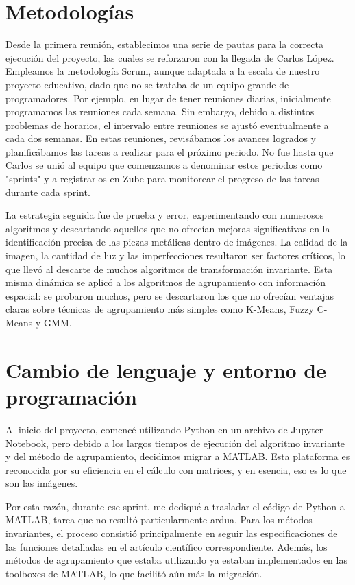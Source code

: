 \section{Metodologías}\label{Metodologías}

Desde la primera reunión, establecimos una serie de pautas para la correcta ejecución del proyecto, las cuales se reforzaron con la llegada de Carlos López. Empleamos la metodología Scrum, aunque adaptada a la escala de nuestro proyecto educativo, dado que no se trataba de un equipo grande de programadores. Por ejemplo, en lugar de tener reuniones diarias, inicialmente programamos las reuniones cada semana. Sin embargo, debido a distintos problemas de horarios, el intervalo entre reuniones se ajustó eventualmente a cada dos semanas. En estas reuniones, revisábamos los avances logrados y planificábamos las tareas a realizar para el próximo periodo. No fue hasta que Carlos se unió al equipo que comenzamos a denominar estos periodos como "sprints" y a registrarlos en Zube para monitorear el progreso de las tareas durante cada sprint.

La estrategia seguida fue de prueba y error, experimentando con numerosos algoritmos y descartando aquellos que no ofrecían mejoras significativas en la identificación precisa de las piezas metálicas dentro de imágenes. La calidad de la imagen, la cantidad de luz y las imperfecciones resultaron ser factores críticos, lo que llevó al descarte de muchos algoritmos de transformación invariante. Esta misma dinámica se aplicó a los algoritmos de agrupamiento con información espacial: se probaron muchos, pero se descartaron los que no ofrecían ventajas claras sobre técnicas de agrupamiento más simples como K-Means, Fuzzy C-Means y GMM.

\section{Cambio de lenguaje y entorno de programación}\label{cambio-de-lenguaje-y-entorno-de-programación}

Al inicio del proyecto, comencé utilizando Python en un archivo de Jupyter Notebook, pero debido a los largos tiempos de ejecución del algoritmo invariante y del método de agrupamiento, decidimos migrar a MATLAB. Esta plataforma es reconocida por su eficiencia en el cálculo con matrices, y en esencia, eso es lo que son las imágenes.

Por esta razón, durante ese sprint, me dediqué a trasladar el código de Python a MATLAB, tarea que no resultó particularmente ardua. Para los métodos invariantes, el proceso consistió principalmente en seguir las especificaciones de las funciones detalladas en el artículo científico correspondiente. Además, los métodos de agrupamiento que estaba utilizando ya estaban implementados en las toolboxes de MATLAB, lo que facilitó aún más la migración.

